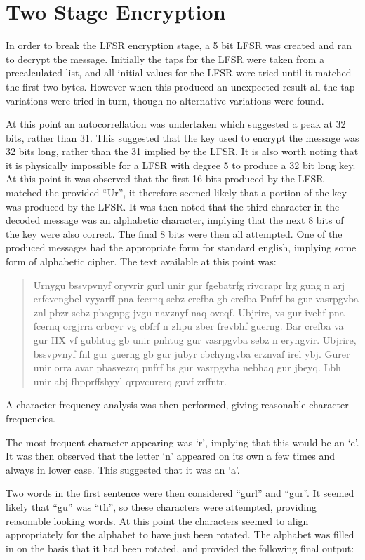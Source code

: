 \section{Two Stage Encryption}

In order to break the LFSR encryption stage, a 5 bit LFSR was created and ran to decrypt the message.
Initially the taps for the LFSR were taken from a precalculated list, and all initial values for the LFSR were tried until it matched the first two bytes.
However when this produced an unexpected result all the tap variations were tried in turn, though no alternative variations were found.

At this point an autocorrellation was undertaken which suggested a peak at 32 bits, rather than 31.
This suggested that the key used to encrypt the message was 32 bits long, rather than the 31 implied by the LFSR.
It is also worth noting that it is physically impossible for a LFSR with degree 5 to produce a 32 bit long key.
At this point it was observed that the first 16 bits produced by the LFSR matched the provided ``Ur'', it therefore seemed likely that a portion of the key was produced by the LFSR.
It was then noted that the third character in the decoded message was an alphabetic character, implying that the next 8 bits of the key were also correct.
The final 8 bits were then all attempted.
One of the produced messages had the appropriate form for standard english, implying some form of alphabetic cipher.
The text available at this point was:
\begin{quote}
Urnygu bssvpvnyf oryvrir gurl unir gur fgebatrfg rivqrapr lrg gung n arj erfcvengbel vyyarff pna fcernq sebz crefba gb crefba Pnfrf bs gur vasrpgvba znl pbzr sebz pbagnpg jvgu navznyf naq oveqf. Ubjrire, vs gur ivehf pna fcernq orgjrra crbcyr vg cbfrf n zhpu zber frevbhf guerng. Bar crefba va gur HX vf gubhtug gb unir pnhtug gur vasrpgvba sebz n eryngvir. Ubjrire, bssvpvnyf fnl gur guerng gb gur jubyr cbchyngvba erznvaf irel ybj. Gurer unir orra avar pbasvezrq pnfrf bs gur vasrpgvba nebhaq gur jbeyq. Lbh unir abj fhpprffshyyl qrpvcurerq guvf zrffntr.
\end{quote}
A character frequency analysis was then performed, giving reasonable character frequencies.

The most frequent character appearing was `r', implying that this would be an `e'.
It was then observed that the letter `n' appeared on its own a few times and always in lower case.
This suggested that it was an `a'.

Two words in the first sentence were then considered ``gurl'' and ``gur''.
It seemed likely that ``gu'' was ``th'', so these characters were attempted, providing reasonable looking words.
At this point the characters seemed to align appropriately for the alphabet to have just been rotated.
The alphabet was filled in on the basis that it had been rotated, and provided the following final output:


